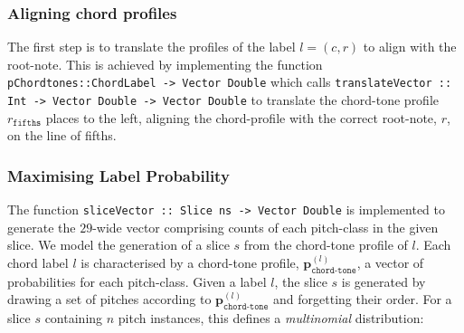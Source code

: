 \documentclass[12pt,a4paper,twoside,openany]{report} \usepackage[pdfborder={0 0 0}]{hyperref}    %
\theoremstyle{definition} \newtheorem{definition}{Definition}[section]
\begin{document}
    \subsubsection{Aligning chord profiles}
    The first step is to translate the profiles of the label $l=(c,r)$ to align with the root-note. This is achieved by
    implementing the function \texttt{pChordtones::ChordLabel -> Vector Double} which calls \texttt{translateVector ::
    Int -> Vector Double -> Vector Double} to translate the chord-tone profile $r_{\texttt{fifths}}$ places to the left,
    aligning the chord-profile with the correct root-note, $r$, on the line of fifths. 

    \subsubsection{Maximising Label Probability}

    The function \texttt{sliceVector :: Slice ns -> Vector Double} is implemented to generate the $29$-wide vector comprising counts of
    each pitch-class in the given slice.
    We model the generation of a slice $s$ from the chord-tone profile of $l$. 
    Each chord label $l$ is characterised by a chord-tone profile,
    $\textbf{p}^{(l)}_{\texttt{chord-tone}}$, a vector of probabilities for each pitch-class. Given a label $l$, the slice $s$ is
    generated by drawing a set of pitches according to $\textbf{p}^{(l)}_{\texttt{chord-tone}}$ and forgetting their order. 
    For a slice $s$ containing $n$ pitch instances, this defines a \textit{multinomial} distribution: 
\end{document}
